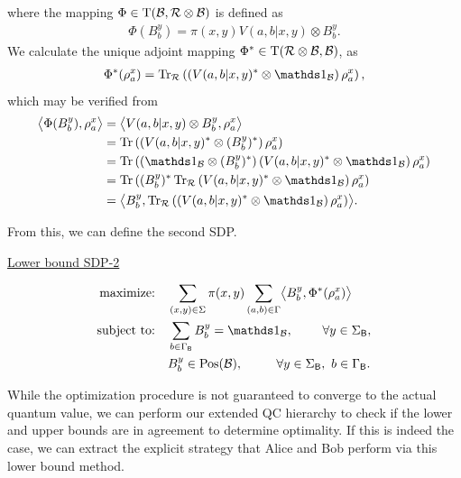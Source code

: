 where the mapping $\Phi \in \mathrm{T}(\mathcal{B}, \mathcal{R} \otimes \mathcal{B})$ is defined as 
\begin{align}
	\Phi(B_b^y) = \pi(x,y) V(a,b|x,y) \otimes B_b^y.
\end{align}
We calculate the unique adjoint mapping $\Phi^* \in \mathrm{T}(\mathcal{R} \otimes \mathcal{B}, \mathcal{B})$, as 
\begin{align}
	\Phi^*(\rho_a^x) = \tr_{\R} \left( \left( V(a,b|x,y)^* \otimes \I_{\B} \right) \rho_a^x \right),
\end{align}
which may be verified from 
\begin{equation}
	\begin{aligned}
		\bigip{\Phi(B_b^y)}{\rho_a^x} &= \bigip{V(a,b|x,y) \otimes B_b^y}{\rho_a^x} \\
		&= \tr \left( \left( V(a,b|x,y)^* \otimes (B_b^y)^* \right) \rho_a^x \right) \\
		&= \tr \left( \left( \I_{\B} \otimes (B_b^y)^* \right) \left( V(a,b|x,y)^* \otimes \I_{\B} \right) \rho_a^x \right) \\
		&= \tr \left( (B_b^y)^* \tr_{\R} \left( V(a,b|x,y)^* \otimes \I_{\B} \right) \rho_a^x \right) \\
		&= \bigip{B_b^y}{\tr_{\R}\left( \left(V(a,b|x,y)^* \otimes \I_{\B} \right) \rho_a^x \right) }.
	\end{aligned}
\end{equation}

From this, we can define the second SDP.
\begin{center}
		\centerline{\underline{Lower bound SDP-2}}\vspace{-7mm}
		\begin{equation} \label{sdp:lower-bound-SDP2}
  		\begin{split}
      \text{maximize:}\quad & \sum_{(x,y) \in \Sigma} \pi(x,y) \sum_{(a,b) \in \Gamma} \bigip{B_b^y}{\Phi^*(\rho_a^x)} \\
      \text{subject to:}\quad & \sum_{b \in \GammaB} B_b^y = \I_{\B}, \qquad \ \forall y \in \SigmaB, \\
      & B_b^y \in \Pos(\B), \qquad \ \ \forall y \in \SigmaB, \ b \in \GammaB. 
  		\end{split}
		\end{equation}
\end{center} 
While the optimization procedure is not guaranteed to converge to the actual quantum value, we can perform our extended QC hierarchy to check if the lower and upper bounds are in agreement to determine optimality. If this is indeed the case, we can extract the explicit strategy that Alice and Bob perform via this lower bound method.

